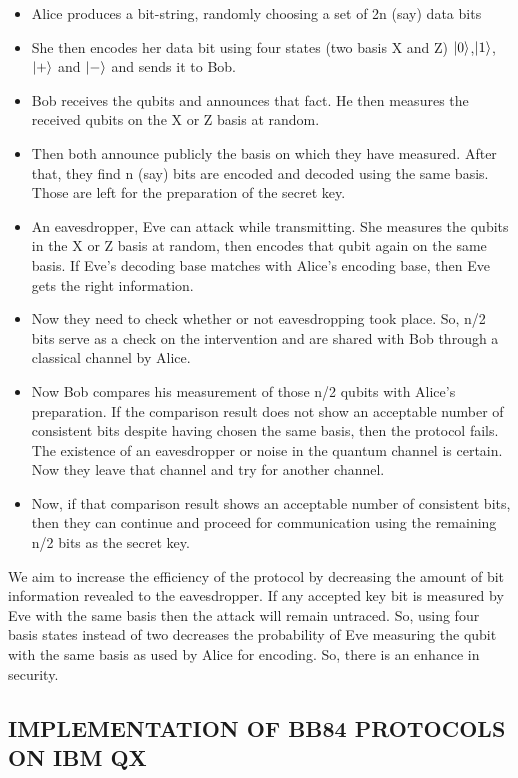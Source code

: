 \documentclass[superscriptaddress,twocolumn,showpacs,prb,floatfix]{revtex4}
\begin{document}
\begin{itemize}
    \item \raggedright Alice produces a bit-string, randomly choosing a set of 2n (say) data bits
    \item  She then encodes her data bit using four states (two basis X and Z) $\Ket{0}$,$\Ket{1}$,$\Ket{+}$ and $\ket{-}$ and sends it to Bob. 
    \item Bob receives the qubits and announces that fact. He then measures the received qubits on the X or Z basis at random.
    \item Then both announce publicly the basis on which they have measured.  After that, they find n (say) bits are encoded and decoded using the same basis. Those are left for the preparation of the secret key.
    \item An eavesdropper, Eve can attack while transmitting. She measures the qubits in the X or Z basis at random, then encodes that qubit again on the same basis. If Eve's decoding base matches with Alice's encoding base, then Eve gets the right information. 
    \item Now they need to check whether or not eavesdropping took place. So, n/2 bits serve as a check on the intervention and are shared with Bob through a classical channel by Alice. 
    \item Now Bob compares his measurement of those n/2 qubits with Alice's preparation. If the comparison result does not show an acceptable number of consistent bits despite having chosen the same basis, then the protocol fails. The existence of an eavesdropper or noise in the quantum channel is certain. Now they leave that channel and try for another channel.
    \item Now, if that comparison result shows an acceptable number of consistent bits, then they can continue and proceed for communication using the remaining n/2 bits as the secret key.
\end{itemize}
We aim to increase the efficiency of the protocol by decreasing the amount of bit information revealed to the eavesdropper. If any accepted key bit is measured by Eve with the same basis then the attack will remain untraced. So, using four basis states instead of two decreases the probability of Eve measuring the qubit with the same basis as used by Alice for encoding. So, there is an enhance in security.
\subsection{IMPLEMENTATION OF BB84 PROTOCOLS ON IBM QX}
\label{SecIIA}
\end{document}

